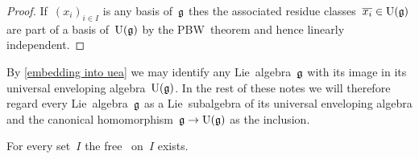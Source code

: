 \begin{proof}
  If~$(x_i)_{i \in I}$ is any basis of~$\mathfrak{g}$ thes the associated residue classes~$\overline{x_i} \in \operatorname{U}(\mathfrak{g})$ are part of a basis of~$\operatorname{U}(\mathfrak{g})$ by the PBW~theorem and hence linearly independent.
\end{proof}


\begin{remark}
  By \cref{embedding into uea} we may identify any Lie~algebra~$\mathfrak{g}$ with its image in its universal enveloping algebra~$\operatorname{U}(\mathfrak{g})$.
  In the rest of these notes we will therefore regard every Lie~algebra~$\mathfrak{g}$ as a Lie~subalgebra of its universal enveloping algebra and the canonical homomorphism~$\mathfrak{g} \to \operatorname{U}(\mathfrak{g})$ as the inclusion.
\end{remark}


\begin{corollary}
  For every set~$I$ the free~{\liealgebra{$\kf$}} on~$I$ exists.
\end{corollary}


